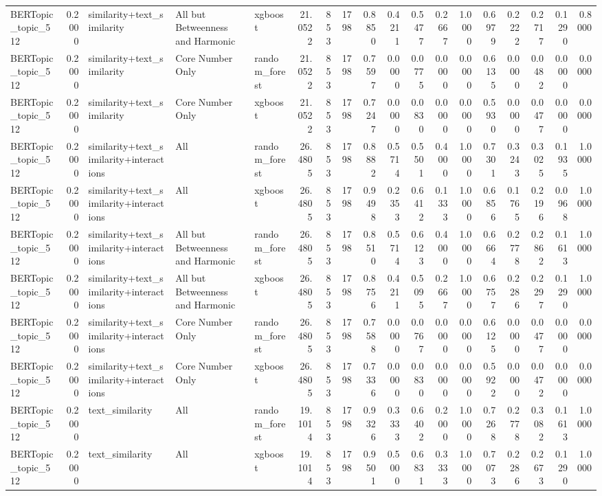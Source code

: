\begin{tabular}{lrlllrrrrrrrrrrrrr}
BERTopic_topic_512 & 0.2000 & similarity+text_similarity & All but Betweenness and Harmonic & xgboost & 21.0522 & 853 & 1798 & 0.8850 & 0.4211 & 0.5477 & 0.2667 & 1.0000 & 0.6979 & 0.2222 & 0.2717 & 0.1290 & 0.8000 \\
BERTopic_topic_512 & 0.2000 & similarity+text_similarity & Core Number Only & random_forest & 21.0522 & 853 & 1798 & 0.7597 & 0.0000 & 0.0775 & 0.0000 & 0.0000 & 0.6135 & 0.0000 & 0.0482 & 0.0000 & 0.0000 \\
BERTopic_topic_512 & 0.2000 & similarity+text_similarity & Core Number Only & xgboost & 21.0522 & 853 & 1798 & 0.7247 & 0.0000 & 0.0830 & 0.0000 & 0.0000 & 0.5930 & 0.0000 & 0.0477 & 0.0000 & 0.0000 \\
BERTopic_topic_512 & 0.2000 & similarity+text_similarity+interactions & All & random_forest & 26.4805 & 853 & 1798 & 0.8882 & 0.5714 & 0.5501 & 0.4000 & 1.0000 & 0.7301 & 0.3243 & 0.3025 & 0.1935 & 1.0000 \\
BERTopic_topic_512 & 0.2000 & similarity+text_similarity+interactions & All & xgboost & 26.4805 & 853 & 1798 & 0.9498 & 0.2353 & 0.6412 & 0.1333 & 1.0000 & 0.6856 & 0.1765 & 0.2196 & 0.0968 & 1.0000 \\
BERTopic_topic_512 & 0.2000 & similarity+text_similarity+interactions & All but Betweenness and Harmonic & random_forest & 26.4805 & 853 & 1798 & 0.8510 & 0.5714 & 0.6123 & 0.4000 & 1.0000 & 0.6664 & 0.2778 & 0.2862 & 0.1613 & 1.0000 \\
BERTopic_topic_512 & 0.2000 & similarity+text_similarity+interactions & All but Betweenness and Harmonic & xgboost & 26.4805 & 853 & 1798 & 0.8756 & 0.4211 & 0.5095 & 0.2667 & 1.0000 & 0.6757 & 0.2286 & 0.2297 & 0.1290 & 1.0000 \\
BERTopic_topic_512 & 0.2000 & similarity+text_similarity+interactions & Core Number Only & random_forest & 26.4805 & 853 & 1798 & 0.7588 & 0.0000 & 0.0767 & 0.0000 & 0.0000 & 0.6125 & 0.0000 & 0.0477 & 0.0000 & 0.0000 \\
BERTopic_topic_512 & 0.2000 & similarity+text_similarity+interactions & Core Number Only & xgboost & 26.4805 & 853 & 1798 & 0.7336 & 0.0000 & 0.0830 & 0.0000 & 0.0000 & 0.5922 & 0.0000 & 0.0472 & 0.0000 & 0.0000 \\
BERTopic_topic_512 & 0.2000 & text_similarity & All & random_forest & 19.1014 & 853 & 1798 & 0.9326 & 0.3333 & 0.6402 & 0.2000 & 1.0000 & 0.7268 & 0.2778 & 0.3082 & 0.1613 & 1.0000 \\
BERTopic_topic_512 & 0.2000 & text_similarity & All & xgboost & 19.1014 & 853 & 1798 & 0.9501 & 0.5000 & 0.6831 & 0.3333 & 1.0000 & 0.7073 & 0.2286 & 0.2673 & 0.1290 & 1.0000 \\

\end{tabular}
